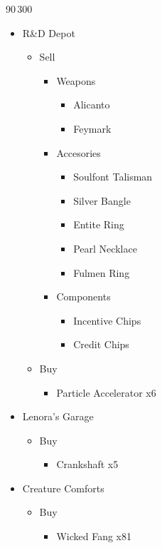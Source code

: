 \begin{shop}{90\,300}
	\begin{itemize}
		\item R\&D Depot
			\begin{itemize}
				\item Sell
					\begin{itemize}
						\item Weapons
							\begin{itemize}
								\item Alicanto
								\item Feymark
							\end{itemize}
						\item Accesories
							\begin{itemize}
								\item Soulfont Talisman
								\item Silver Bangle
								\item Entite Ring
								\item Pearl Necklace
								\item Fulmen Ring
							\end{itemize}
						\item Components
							\begin{itemize}
								\item Incentive Chips
								\item Credit Chips
							\end{itemize}
					\end{itemize}
				\item Buy
					\begin{itemize}
						\item Particle Accelerator x6
					\end{itemize}
			\end{itemize}
		\item Lenora's Garage
			\begin{itemize}
				\item Buy
					\begin{itemize}
						\item Crankshaft x5
					\end{itemize}
			\end{itemize}
		\item Creature Comforts
			\begin{itemize}
				\item Buy
					\begin{itemize}
						\item Wicked Fang x81

\end{itemize}
\end{itemize}
\end{itemize}
\end{shop}
